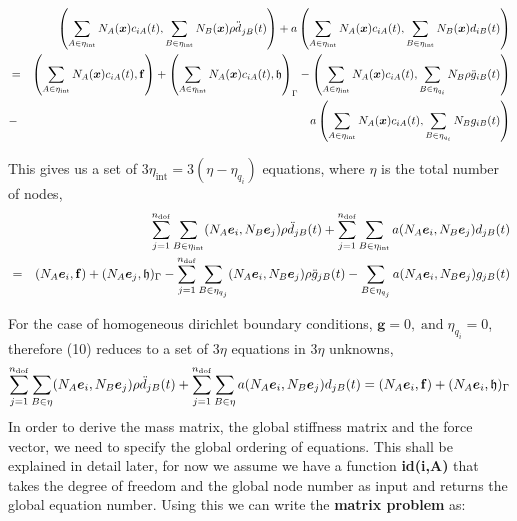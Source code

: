 \documentclass[10pt]{article}
\newcommand{\tmstrong}[1]{\textbf{#1}}
\newcommand{\tmmathbf}[1]{\ensuremath{\boldsymbol{#1}}}
\newcommand{\tmop}[1]{\ensuremath{\operatorname{#1}}}
\begin{document}
\begin{eqnarray*}
& & \left( \sum_{A \in \eta_{\tmop{int}}} N_A (\tmmathbf{x}) c_{i A} ( t ),
   \sum_{B \in \eta_{\tmop{int}}} N_B (\tmmathbf{x}) \rho \ddot{d_{}}_{j B} (
   t ) \right) + a \left( \sum_{A \in \eta_{\tmop{int}}} N_A (\tmmathbf{x})
   c_{i A} ( t ), \sum_{B \in \eta_{\tmop{int}}} N_B (\tmmathbf{x}) d_{i B} (
   t ) \right) \\
&=& \left( \sum_{A \in \eta_{\tmop{int}}} N_A (\tmmathbf{x}) c_{i
   A} ( t ),\force \right) + \left( \sum_{A \in \eta_{\tmop{int}}} N_A
   (\tmmathbf{x}) c_{i A} ( t ),\mathfrak{h} \right)_{\Gamma} -   
   \left( \sum_{A \in \eta_{\tmop{int}}} N_A (\tmmathbf{x}) c_{i A} ( t ),
   \sum_{B \in \eta_{q_i}} N_B \rho \ddot{g}_{i B} ( t ) \right) \\
&-& a\left(  \sum_{A \in \eta_{\tmop{int}}} N_A (\tmmathbf{x}) c_{i A} ( t ), \sum_{B
   \in \eta_{q_i}} N_B g_{i B} ( t ) \right) 
\end{eqnarray*}

This gives us a set of $3 \eta_{\tmop{int}} = 3 ( \eta - \eta_{q_i} )$
equations, where $\eta$ is the total number of nodes,
\begin{eqnarray*}
& & \sum^{n_{\tmop{dof}}}_{j = 1} \sum_{B \in \eta_{\tmop{int}}} ( N_A
  \tmmathbf{e}_i, N_B \tmmathbf{e}_j ) \rho \ddot{d}_{j B} ( t ) + \sum_{j =
  1}^{n_{\tmop{dof}}} \sum_{B \in \eta_{\tmop{int}}} a ( N_A \tmmathbf{e}_i,
  N_B \tmmathbf{e}_j ) d_{j B} ( t ) \\
&=& ( N_A \tmmathbf{e}_i,\force) + ( N_A \tmmathbf{e}_j,\mathfrak{h})_{\Gamma}  - \sum^{n_{\tmop{dof}}}_{j = 1}
  \sum_{B \in \eta_{q_j}} ( N_A \tmmathbf{e}_i, N_B \tmmathbf{e}_j ) \rho
  \ddot{g}_{j B} ( t ) - \sum_{B \in \eta_{q_j}} a ( N_A \tmmathbf{e}_i, N_B
  \tmmathbf{e}_j ) g_{j B} ( t )
\end{eqnarray*}


For the case of homogeneous dirichlet boundary conditions, $\tmmathbf{g}= 0,
\tmop{and} \eta_{q_i} = 0$, therefore (10) reduces to a set of $3 \eta$
equations in $3 \eta$ unknowns,
\begin{equation}
  \sum^{n_{\tmop{dof}}}_{j = 1} \sum_{B \in \eta} ( N_A \tmmathbf{e}_i, N_B
  \tmmathbf{e}_j ) \rho \ddot{d}_{j B} ( t ) + \sum^{n_{\tmop{dof}}}_{j = 1}
  \sum_{B \in \eta} a ( N_A \tmmathbf{e}_i, N_B \tmmathbf{e}_j ) d_{j B} ( t )
  = ( N_A \tmmathbf{e}_i,\force) + ( N_A
  \tmmathbf{e}_i,\mathfrak{h})_{\Gamma}
\end{equation}
In order to derive the mass matrix, the global stiffness matrix and the force
vector, we need to specify the global ordering of equations. This shall be
explained in detail later, for now we assume we have a function
{\tmstrong{id(i,A)}} that takes the degree of freedom and the global node
number as input and returns the global equation number. Using this we can
write the {\tmstrong{matrix problem}} as:
\end{document}
